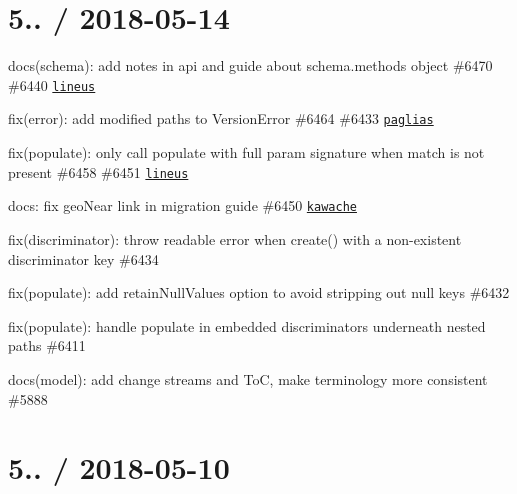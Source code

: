 \section*{5.. / 2018-\/05-\/14 }


\begin{DoxyItemize}
\item docs(schema)\+: add notes in api and guide about schema.\+methods object \#6470 \#6440 \href{https://github.com/lineus}{\tt lineus}
\item fix(error)\+: add modified paths to Version\+Error \#6464 \#6433 \href{https://github.com/paglias}{\tt paglias}
\item fix(populate)\+: only call populate with full param signature when match is not present \#6458 \#6451 \href{https://github.com/lineus}{\tt lineus}
\item docs\+: fix geo\+Near link in migration guide \#6450 \href{https://github.com/kawache}{\tt kawache}
\item fix(discriminator)\+: throw readable error when {\ttfamily create()} with a non-\/existent discriminator key \#6434
\item fix(populate)\+: add {\ttfamily retain\+Null\+Values} option to avoid stripping out null keys \#6432
\item fix(populate)\+: handle populate in embedded discriminators underneath nested paths \#6411
\item docs(model)\+: add change streams and ToC, make terminology more consistent \#5888
\end{DoxyItemize}

\section*{5.. / 2018-\/05-\/10 }


